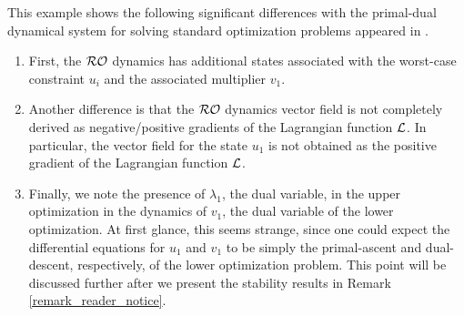 \documentclass[journal,twoside,web]{ieeecolor}
\newtheorem{assumption}[theorem]{Assumption}
\begin{document}
This example shows the following significant differences with the primal-dual dynamical system for solving standard optimization problems appeared in \cite{feijer2010,cherukuri2016}.
\begin{enumerate}
\item First, the ${\cal RO}$ dynamics has additional states associated with the worst-case constraint $u_i$ and the associated multiplier $v_1$.  
 \item Another difference is that the ${\cal RO}$ dynamics vector field is not completely derived as negative/positive gradients of the Lagrangian function ${\cal L}$. In particular, the vector field for the state $u_1$ is not obtained as the positive gradient of the Lagrangian function ${\cal L}$.
\item Finally, we note the presence of $\lambda_1$, the dual variable, in the upper optimization in the dynamics of $v_1$, the dual variable of the lower optimization. At first glance, this seems strange, since one could expect the differential equations for $u_1$ and $v_1$ to be simply the primal-ascent and dual-descent, respectively, of the lower optimization problem. This point will be discussed further after we present the stability results in Remark \ref{remark_reader_notice}.
\end{enumerate}


\end{document}
